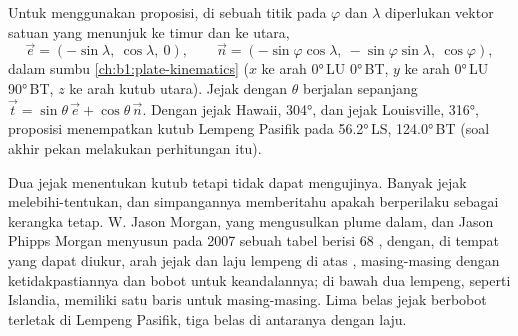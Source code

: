 Untuk menggunakan proposisi, di sebuah titik pada  $\varphi$ dan  $\lambda$
diperlukan vektor satuan yang menunjuk ke timur dan ke utara,
\[
  \vec e = (-\sin\lambda,\ \cos\lambda,\ 0),\qquad
  \vec n = (-\sin\varphi\cos\lambda,\ -\sin\varphi\sin\lambda,\ \cos\varphi),
\]
dalam sumbu \cref{ch:b1:plate-kinematics} ($x$ ke arah \ang{0}\,LU \ang{0}\,BT, $y$ ke arah
\ang{0}\,LU \ang{90}\,BT, $z$ ke arah kutub utara). Jejak dengan  $\theta$ berjalan
sepanjang $\vec t = \sin\theta\,\vec e +
\cos\theta\,\vec n$. Dengan jejak Hawaii,  \ang{304}, dan jejak Louisville,  \ang{316},
proposisi menempatkan kutub Lempeng Pasifik pada \ang{56.2}\,LS, \ang{124.0}\,BT (soal akhir
pekan melakukan perhitungan itu).

Dua jejak menentukan kutub tetapi tidak dapat mengujinya. Banyak jejak melebihi-tentukan,
dan simpangannya memberitahu apakah  berperilaku sebagai kerangka tetap. W. Jason
Morgan, yang mengusulkan plume dalam, dan Jason Phipps Morgan menyusun pada 2007 sebuah
tabel berisi 68 , dengan, di tempat yang dapat diukur, arah jejak dan laju lempeng
di atas , masing-masing dengan ketidakpastiannya dan bobot untuk keandalannya;
 di bawah dua lempeng, seperti Islandia, memiliki satu baris untuk masing-masing.
Lima belas jejak berbobot terletak di Lempeng Pasifik, tiga belas di antaranya dengan laju.

